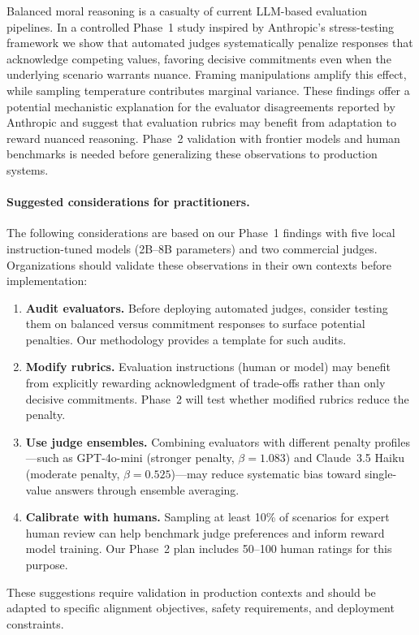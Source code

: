 \documentclass[11pt]{article}
\begin{document}
Balanced moral reasoning is a casualty of current LLM-based evaluation pipelines. In a controlled Phase~1 study inspired by Anthropic's stress-testing framework we show that automated judges systematically penalize responses that acknowledge competing values, favoring decisive commitments even when the underlying scenario warrants nuance. Framing manipulations amplify this effect, while sampling temperature contributes marginal variance. These findings offer a potential mechanistic explanation for the evaluator disagreements reported by Anthropic and suggest that evaluation rubrics may benefit from adaptation to reward nuanced reasoning. Phase~2 validation with frontier models and human benchmarks is needed before generalizing these observations to production systems.

\paragraph{Suggested considerations for practitioners.}
The following considerations are based on our Phase~1 findings with five local instruction-tuned models (2B--8B parameters) and two commercial judges. Organizations should validate these observations in their own contexts before implementation:
\begin{enumerate}
    \item \textbf{Audit evaluators.} Before deploying automated judges, consider testing them on balanced versus commitment responses to surface potential penalties. Our methodology provides a template for such audits.
    \item \textbf{Modify rubrics.} Evaluation instructions (human or model) may benefit from explicitly rewarding acknowledgment of trade-offs rather than only decisive commitments. Phase~2 will test whether modified rubrics reduce the penalty.
    \item \textbf{Use judge ensembles.} Combining evaluators with different penalty profiles---such as GPT-4o-mini (stronger penalty, $\beta = 1.083$) and Claude~3.5 Haiku (moderate penalty, $\beta = 0.525$)---may reduce systematic bias toward single-value answers through ensemble averaging.
    \item \textbf{Calibrate with humans.} Sampling at least 10\% of scenarios for expert human review can help benchmark judge preferences and inform reward model training. Our Phase~2 plan includes 50--100 human ratings for this purpose.
\end{enumerate}
These suggestions require validation in production contexts and should be adapted to specific alignment objectives, safety requirements, and deployment constraints.
\end{document}
